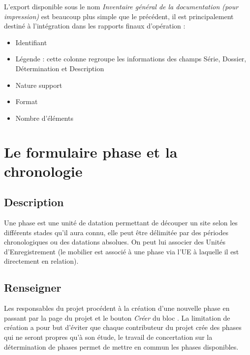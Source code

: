 \documentclass[letterpaper,10pt,french]{sphinxmanual}
\begin{document}
L'export disponible sous le nom \emph{Inventaire général de la documentation (pour impression)} est beaucoup plus simple que le précédent, il est principalement destiné à l'intégration dans les rapports finaux d'opération :
\begin{itemize}
\item {} 
Identifiant

\item {} 
Légende : cette colonne regroupe les informations des champs Série, Dossier, Détermination et Description

\item {} 
Nature support

\item {} 
Format

\item {} 
Nombre d’éléments

\end{itemize}


\chapter{Le formulaire phase et la chronologie}
\label{manuel/formulaire_datation:le-formulaire-phase-et-la-chronologie}\label{manuel/formulaire_datation::doc}

\section{Description}
\label{manuel/formulaire_datation:description}
Une phase est une unité de datation permettant de découper un site selon les différents stades qu'il aura connu, elle peut être délimitée par des périodes chronologiques ou des datations absolues. On peut lui associer des Unités d'Enregistrement (le mobilier est associé à une phase via l'UE à laquelle il est directement en relation).
\begin{figure}[htbp]
\centering

\end{figure}


\section{Renseigner}
\label{manuel/formulaire_datation:renseigner}
Les responsables du projet procédent à la création d'une nouvelle phase en passant par la page du projet et le bouton \emph{Créer} du bloc . La limitation de création a pour but d'éviter que chaque contributeur du projet crée des phases qui ne seront propres qu'à son étude, le travail de concertation sur la détermination de phases permet de mettre en commun les phases disponibles.
\end{document}
